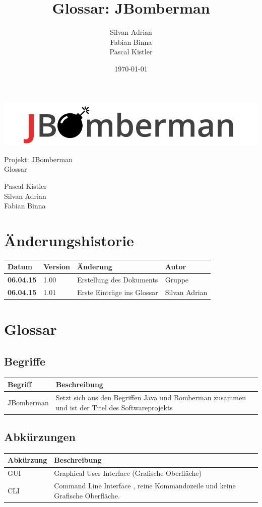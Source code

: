 \documentclass[11pt]{scrartcl}
\title{Glossar: JBomberman}
\author{Silvan Adrian \\ Fabian Binna \\ Pascal Kistler}
\date{\today{}}
\begin{document}
\def\arraystretch{1.5}
\begin{titlepage}
\begin{center}
\vspace{10em}
\includegraphics[scale=2]{jbomberman}
\vspace{10em}
\end{center}
\begin{center}
\huge {Projekt: JBomberman} \\
\huge {Glossar}
\end{center}
\begin{center}
\vspace{10em}
\LARGE {Pascal Kistler} \\
\LARGE {Silvan Adrian} \\
\LARGE {Fabian Binna}
\end{center}

\end{titlepage}

\newpage
\section{Änderungshistorie}
\label{sec:Änderungen}

\begin{tabularx}{\linewidth}{l l l l}
\textbf{Datum} & \textbf{Version} & \textbf{Änderung}  & \textbf{Autor} \\
\hline
\textbf{06.04.15} & 1.00 & Erstellung des Dokuments & Gruppe \\
\textbf{06.04.15} & 1.01 & Erste Einträge ins Glossar & Silvan Adrian \\
\end{tabularx}

\newpage
\tableofcontents
\newpage
\section{Glossar}
\subsection{Begriffe}

\begin{tabularx}{\linewidth}{l | X}
    \textbf{Begriff} & \textbf{Beschreibung}\\
    \hline
    JBomberman & Setzt sich aus den Begriffen Java und Bomberman zusammen und ist der Titel des Softwareprojekts\\
    \hline
    
\end{tabularx}

\subsection{Abkürzungen}
\begin{tabularx}{\linewidth}{l | X}
    \textbf{Abkürzung} & \textbf{Beschreibung}\\
    \hline
    GUI & Graphical User Interface (Grafische Oberfläche)\\
    \hline
    CLI & Command Line Interface  , reine Kommandozeile und keine Grafische Oberfläche.
\end{tabularx}
\end{document}

